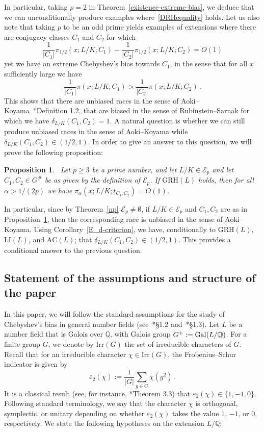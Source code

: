 \documentclass[12pt]{amsart}
\numberwithin{equation}{section}
\newcommand{\Gal}{{\rm Gal}}
\newcommand{\Q}{\mathbb Q}
\newtheorem{prop}[X]{Proposition}
\theoremstyle{definition}
\theoremstyle{remark}
\begin{document}
In particular, taking $p=2$ in Theorem~\ref{existence-extreme-bias}, we deduce that we can unconditionally produce examples where~\eqref{DRHequality} holds. Let us also note that taking $p$ to be an odd prime yields examples of extensions where there are conjugacy classes $C_1$ and $C_2$ for which \[ \frac{1}{|C_1|}\pi_{1/2}(x;L/K;C_1)-\frac{1}{|C_2|}\pi_{1/2}(x;L/K;C_2)=O(1)\]
yet we have an extreme Chebyshev's bias towards $C_1$, in the sense that for all $x$ sufficiently large we have \[ \frac{1}{|C_1|}\pi(x;L/K;C_1)>\frac{1}{|C_2|}\pi(x;L/K;C_2)\, .\]
This shows that there are unbiased races in the sense of Aoki--Koyama~\cite{Ao-Ko}*{Definition 1.2}, that are biased in the sense of Rubinstein--Sarnak for which we have $\delta_{L/K}(C_1,C_2)=1$. A natural question is whether we can still produce unbiased races in the sense of Aoki--Koyama while $\delta_{L/K}(C_1,C_2)\in (1/2,1)$.
In order to give an answer to this question, we will prove the following proposition: 
\begin{prop}~\label{Aoki-Koyamaunbiasedness}
    Let $p\ge 3$ be a prime number, and let $L/K\in \mathcal{E}_p$ and let $C_1,C_2\in G^\#$ be as given by the definition of $\mathcal{E}_p$. If $\mathrm{GRH}(L)$ holds, then for all $\alpha>1/(2p)$ we have $\pi_\alpha(x;L/K;t_{C_1,C_2})=O(1)$.
\end{prop}
In particular, since by Theorem~\ref{np} $\mathcal{E}_p\ne\emptyset$, if $L/K\in \mathcal{E}_p$ and $C_1,C_2$ are as in Proposition~\ref{Aoki-Koyamaunbiasedness}, then the corresponding race is unbiased in the sense of Aoki--Koyama. Using Corollary~\ref{E_d-criterion}, we have, conditionally to $\mathrm{GRH}(L)$, $\mathrm{LI}(L)$, and $\mathrm{AC}(L)$; that $\delta_{L/K}(C_1,C_2)\in (1/2,1)$. This provides a conditional answer to the previous question. 

\subsection{Statement of the assumptions and structure of the paper}\label{Hypotheses}

In this paper, we will follow the standard assumptions for the study of Chebyshev's bias in general number fields (see~\cite{FJ}*{\S 1.2} and~\cite{Bail}*{\S 1.3}). Let $L$ be a number field that is Galois over $\Q$, with Galois group $G^+ := \Gal(L/\Q)$. For a finite group $G$, we denote by $\mathrm{Irr}(G)$ the set of irreducible characters of $G$. Recall that for an irreducible character $\chi \in \mathrm{Irr}(G)$, the Frobenius--Schur indicator is given by
\[ \varepsilon_2(\chi) := \frac{1}{|G|}\sum_{g\in G} \chi(g^2)\, . \]
It is a classical result (see, for instance, \cite{FJ}*{Theorem 3.3}) that $\varepsilon_2(\chi) \in \{1, -1, 0\}$. Following standard terminology, we say that the character $\chi$ is orthogonal, symplectic, or unitary depending on whether $\varepsilon_2(\chi)$ takes the value $1$, $-1$, or $0$, respectively. 
We state the following hypotheses on the extension $L/\Q$:
\end{document}
